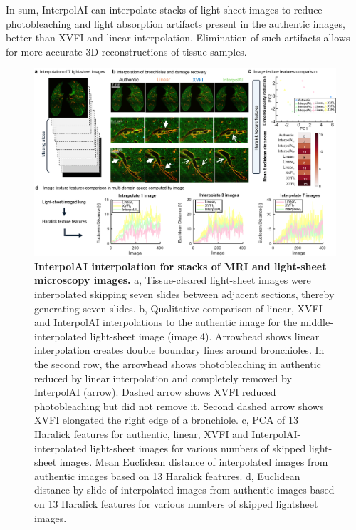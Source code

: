 \begin{refsection}
    In sum, InterpolAI can interpolate stacks of light-sheet images to reduce photobleaching and light absorption artifacts present in the authentic images, better than XVFI and linear interpolation. Elimination of such artifacts allows for more accurate 3D reconstructions of tissue samples.

    \begin{figure}[!htb] 
        \begin{center}
            \includegraphics[width=1\textwidth,height=0.85\textheight,keepaspectratio]{figures/chapter6/fig_3.png}
            \captionsetup{font=small}
            \caption{\textbf{InterpolAI interpolation for stacks of MRI and light-sheet microscopy
            images.} a, Tissue-cleared light-sheet images were interpolated skipping seven
            slides between adjacent sections, thereby generating seven slides. b, Qualitative
            comparison of linear, XVFI and InterpolAI interpolations to the authentic image
            for the middle-interpolated light-sheet image (image 4). Arrowhead shows
            linear interpolation creates double boundary lines around bronchioles. In the
            second row, the arrowhead shows photobleaching in authentic reduced by linear
            interpolation and completely removed by InterpolAI (arrow). Dashed arrow
            shows XVFI reduced photobleaching but did not remove it. Second dashed
            arrow shows XVFI elongated the right edge of a bronchiole. c, PCA of 13 Haralick
            features for authentic, linear, XVFI and InterpolAI-interpolated light-sheet
            images for various numbers of skipped light-sheet images. Mean Euclidean
            distance of interpolated images from authentic images based on 13 Haralick
            features. d, Euclidean distance by slide of interpolated images from authentic
            images based on 13 Haralick features for various numbers of skipped lightsheet
            images.}
            \label{chapter6_fig3}
        \end{center}
    \end{figure}
    

\end{refsection}
